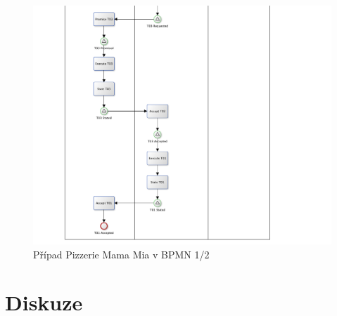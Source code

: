 \documentclass[]{article}
\begin{document}
\begin{center}
\begin{figure}[H]
\centerline{\includegraphics[width=1.28\textwidth,height=\textheight,keepaspectratio]{obrazky/pizzeria-bpmn-2}}
\caption{Případ Pizzerie Mama Mia v BPMN 1/2}
\label{fig:psd_pizzeria}
\end{figure}
\end{center}

\section{Diskuze}

\nocite{*}


\end{document}
